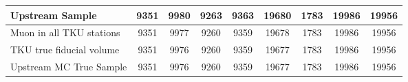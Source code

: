 \begin{landscape}
\begin{table}
\begin{tabular}[pos]{l|cccccccc}
\hline                                            
Upstream Sample                                    &    9351  &    9980  &    9263  &    9363  &   19680  &    1783  &   19986  &   19956  \\
\hline                                            
Muon in all TKU stations                           &    9351  &    9977  &    9260  &    9359  &   19678  &    1783  &   19986  &   19956  \\
TKU true fiducial volume                           &    9351  &    9976  &    9260  &    9359  &   19677  &    1783  &   19986  &   19956  \\
\hline                                            
Upstream MC True Sample                            &    9351  &    9976  &    9260  &    9359  &   19677  &    1783  &   19986  &   19956  \\
\hline                                            

\end{tabular}
\end{table}
\end{landscape}


